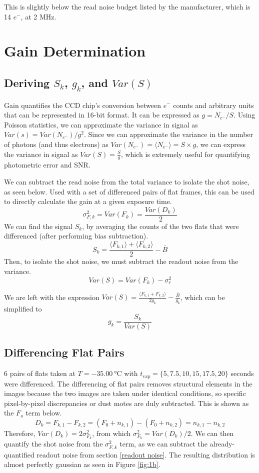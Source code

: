 \documentclass[12pt, letterpaper]{article}
\begin{document}
This is slightly below the read noise budget listed by the manufacturer, which is 14 $e^-$, at 2 MHz.

\section{Gain Determination}
\subsection{Deriving $S_k$, $g_k$, and $Var(S)$}
\label{gain derivation}
Gain quantifies the CCD chip's  conversion between $e^-$ counts and arbitrary units that can be represented in 16-bit format.  It can be expressed as $g = N_{e^-}/S$. Using Poisson statistics, we can approximate the variance in signal as $Var(s) = Var(N_{e^-})/g^2$. Since we can approximate the variance in the number of photons (and thus electrons) as $Var(N_{e^-}) = \langle N_{e^-} \rangle =  S \times g$, we can express the variance in signal as $Var(S) = \frac{S}{g}$, which is extremely useful for quantifying photometric error and SNR. 

We can subtract the read noise from the total variance to isolate the shot noise, as seen below. Used with a set of differenced pairs of flat frames, this can be used to directly calculate the gain at a given exposure time. 
$$\sigma^2_{
F,k }= Var(F_k) = \frac{Var(D_k)}{2}
$$
We can find the signal $S_k$, by averaging the counts of the two flats that were differenced (after performing bias subtraction). $$S_k = \frac{\langle F_{k, 1} \rangle + \langle F_{k, 2} \rangle}{2} - \bar B $$
Then, to isolate the shot noise, we must subtract the readout noise from the variance. $$Var(S) = Var(F_k) - \sigma^2_r$$

We are left with the expression
$Var(S) = \frac{\langle F_{k, 1} + F_{k, 2}\rangle}{2g_k} - \frac{\bar B}{g_k}$, which can be simplified to $$g_k =\frac {S_k}{Var(S)}$$
\subsection{Differencing Flat Pairs}
6 pairs of flats taken at $T = \qty{-35.00}{\degreeCelsius}$ with $t_{exp} = \{5, 7.5, 10, 15, 17.5, 20\}$ seconds were differenced. The differencing of flat pairs removes structural elements in the images because the two images are taken under identical conditions, so specific pixel-by-pixel discrepancies or dust motes are duly subtracted. This is shown as the $F_o$ term below.
$$D_k = F_{k,1} - F_{k,2} = (F_0 + n_{k,1}) - (F_0 + n_{k,2}) = n_{k,1} - n_{k,2}$$
Therefore, $Var(D_k) = 2\sigma^2_{F_k}$, from which $\sigma^2_{F_k} = Var(D_k)/2$. We can then quantify the shot noise from the ${\sigma^2_{F, k}}$ term, as we can subtract the already-quantified readout noise from section \ref{readout noise}. The resulting distribution is almost perfectly gaussian as seen in Figure \ref{fig:1b}. 
\end{document}
